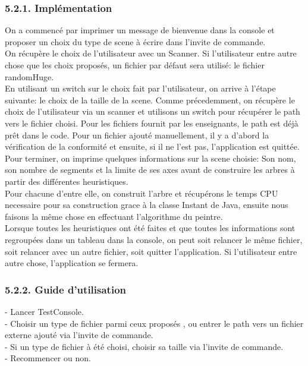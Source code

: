 \documentclass[a4paper,12pt]{report}	%
\begin{document}
	{\subsubsection*{5.2.1. Implémentation}}
	  On a commencé par imprimer un message de bienvenue dans la console et proposer un choix du type de scene à écrire dans l'invite de commande. \\
\indent On récupère le choix de l'utilisateur avec un Scanner. Si l'utilisateur entre autre chose que les choix proposés, un fichier par défaut sera utilisé: le fichier randomHuge. \\
\indent En utilisant un switch sur le choix fait par l'utilisateur, on arrive à l'étape suivante: le choix de la taille de la scene.
\indent Comme précedemment, on récupère le choix de l'utilisateur via un scanner et utilisons un switch pour récupérer le path vers le fichier choisi. Pour les fichiers fournit par les enseignants, le path est déjà prêt dans le code. Pour un fichier ajouté manuellement, il y a d'abord la vérification de la conformité et ensuite, si il ne l'est pas, l'application est quittée. \\
\indent Pour terminer, on imprime quelques informations sur la scene choisie: Son nom, son nombre de segments et la limite de ses axes avant de construire les arbres à partir des différentes heuristiques.\\
\indent Pour chacune d'entre elle, on construit l'arbre et récupérons le temps CPU necessaire pour sa construction grace à la classe Instant de Java, ensuite nous faisons la même chose en effectuant l'algorithme du peintre. \\
\indent Lorsque toutes les heuristiques ont été faites et que toutes les informations sont regroupées dans un tableau dans la console, on peut soit relancer le même fichier, soit relancer avec un autre fichier, soit quitter l'application. Si l'utilisateur entre autre chose, l'application se fermera.\\
	
    {\subsubsection*{5.2.2. Guide d'utilisation}}
	    - Lancer TestConsole.\\
\indent - Choisir un type de fichier parmi ceux proposés , ou entrer le path vers un fichier externe ajouté via l'invite de commande.\\
\indent - Si un type de fichier à été choisi, choisir sa taille via l'invite de commande.\\
\indent - Recommencer ou non.\\
	
\end{document}
